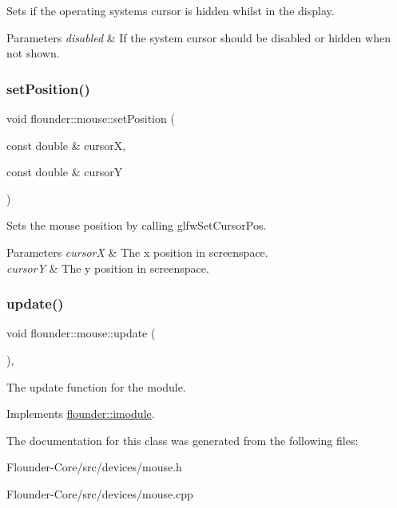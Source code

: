 Sets if the operating systems cursor is hidden whilst in the display. 


\begin{DoxyParams}{Parameters}
{\em disabled} & If the system cursor should be disabled or hidden when not shown. \\
\hline
\end{DoxyParams}
\mbox{\label{classflounder_1_1mouse_a47fae906e36e62f4cfd5939b37a0476c}} 
\subsubsection{\texorpdfstring{set\+Position()}{setPosition()}}
{\footnotesize\ttfamily void flounder\+::mouse\+::set\+Position (\begin{DoxyParamCaption}\item[{const double \&}]{cursorX,  }\item[{const double \&}]{cursorY }\end{DoxyParamCaption})}



Sets the mouse position by calling glfw\+Set\+Cursor\+Pos. 


\begin{DoxyParams}{Parameters}
{\em cursorX} & The x position in screenspace. \\
\hline
{\em cursorY} & The y position in screenspace. \\
\hline
\end{DoxyParams}
\mbox{\label{classflounder_1_1mouse_aa1b1d60e1d1cf4ec7d19eaef65e040bc}} 
\subsubsection{\texorpdfstring{update()}{update()}}
{\footnotesize\ttfamily void flounder\+::mouse\+::update (\begin{DoxyParamCaption}{ }\end{DoxyParamCaption})\hspace{0.3cm}{\ttfamily [override]}, {\ttfamily [virtual]}}



The update function for the module. 



Implements \hyperlink{classflounder_1_1imodule_a9a53d48a46b5f6b16a92b2cd8503f74a}{flounder\+::imodule}.



The documentation for this class was generated from the following files\+:\begin{DoxyCompactItemize}
\item 
Flounder-\/\+Core/src/devices/mouse.\+h\item 
Flounder-\/\+Core/src/devices/mouse.\+cpp\end{DoxyCompactItemize}
